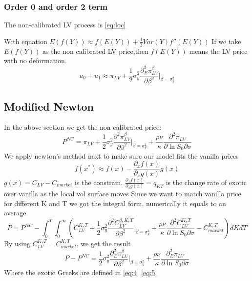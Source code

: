 \documentclass[12pt]{article}
\numberwithin{equation}{section}
\begin{document}
\subsubsection{Order 0 and order 2 term}

The non-calibrated LV process is \ref{eq:loc}

With equation $E(f(Y))\approx f(E(Y))+\frac 1 2 Var(Y) f''(E(Y))$
If we take  $E(f(Y))$ as the non calibrated LV price,then $f(E(Y))$ means the LV price with no deformation.
\begin{equation}
    u_0+u_1\approx\pi_{LV}+\frac 1 2 \sigma^2_y \frac{\partial_E^2 \pi^\beta_{LV}}{\partial \beta^2}|_{\beta=\sigma^2_y}
\end{equation}

\subsection{Modified Newton}
In the above section we get the non-calibrated price:
\begin{equation}
    P^{NC}=\pi_{LV}+\frac 1 2 \sigma^2_y \frac{\partial^2 \pi^\beta_{LV}}{\partial \beta^2}|_{\beta=\sigma^2_y}+\frac{\rho \nu}{\kappa}\frac{\partial^2\pi_{LV}}{\partial \ln S_0\partial \sigma}
\end{equation}
We apply newton's method next to make sure our model fits the vanilla prices
\begin{equation}
    f(x^*)\approx f(x)-\frac{\partial_x f(x)}{\partial_x g(x)}g(x)
\end{equation}
$g(x)=C_{LV}-C_{market}$ is the constrain. 
$\frac{\partial_x f(x)}{\partial_x g(x)}=q_{KT}$ is the change rate of exotic over vanilla as the local vol surface moves
Since we want to match vanilla price for different K and T we got the integral form, numerically it equals to an average.
\begin{equation}
    P=P^{NC}-\int_0^T\int_0^{\infty}(C_{LV}^{K,T}+\frac 1 2 \sigma^2_y \frac{\partial^2 C^{\beta,K,T}_{LV}}{\partial \beta^2}|_{\beta=\sigma^2_y}+\frac{\rho \nu}{\kappa}\frac{\partial^2 C_{LV}^{K,T}}{\partial \ln S_0\partial \sigma}-C_{market}^{K,T})dKdT
\end{equation}
By using $C_{LV}^{K,T}=C_{market}^{K,T}$, we get the result
\begin{equation}
    P-P^{NC}=\frac 1 2 \sigma^2_y \frac{\partial_E^2 \pi^\beta_{LV}}{\partial \beta^2}|_{\beta=\sigma^2_y}
    +\frac{\rho \nu}{\kappa}\frac{\partial_E^2 \pi_{LV}}{\partial \ln S_0\partial \sigma}
\end{equation}
Where the exotic Greeks are defined in \ref{eq:4} \ref{eq:5} 
\end{document}
